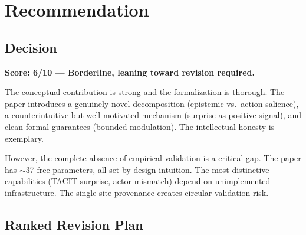 \documentclass[11pt,a4paper]{article}
\begin{document}
\section{Recommendation}

\subsection{Decision}

\textbf{Score: 6/10 --- Borderline, leaning toward revision required.}

The conceptual contribution is strong and the formalization is thorough. The paper introduces a genuinely novel decomposition (epistemic vs.\ action salience), a counterintuitive but well-motivated mechanism (surprise-as-positive-signal), and clean formal guarantees (bounded modulation). The intellectual honesty is exemplary.

However, the complete absence of empirical validation is a critical gap. The paper has $\sim$37 free parameters, all set by design intuition. The most distinctive capabilities (TACIT surprise, actor mismatch) depend on unimplemented infrastructure. The single-site provenance creates circular validation risk.

\subsection{Ranked Revision Plan}
\end{document}
